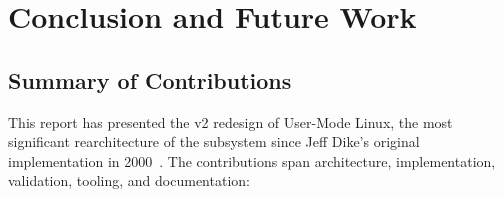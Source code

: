 \chapter{Conclusion and Future Work}
\label{ch:conclusion}

\section{Summary of Contributions}
\label{sec:conclusion-summary}

This report has presented the v2 redesign of User-Mode Linux, the most
significant rearchitecture of the \UML{} subsystem since Jeff Dike's
original implementation in 2000~\cite{dike2000}.  The contributions
span architecture, implementation, validation, tooling, and
documentation:

